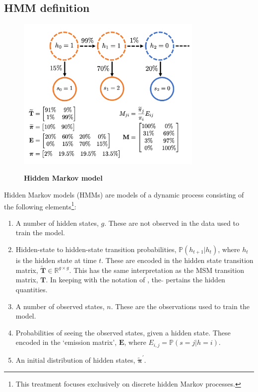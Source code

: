 \subsection{HMM definition}
\begin{figure}
    \centering
    \caption{\textbf{Hidden Markov model}}
    \includegraphics[width=0.8\textwidth]{chapters/theory/figures/hmm.png}
    \label{fig:theory_hmm}
\end{figure}
Hidden Markov models (HMMs) are models of a dynamic process consisting of the following elements\footnote{This treatment focuses exclusively on discrete hidden Markov processes.}: \cite{rabinerTutorialHiddenMarkov1989} 
\begin{enumerate}
    \item A number of hidden states, $g$. These are not observed in the data used to train the model.  
    \item Hidden-state to hidden-state transition probabilities, $\mathbb{P}(h_{t+1}|h_{t})$, where $h_{t}$ is the hidden state at time $t$. These are encoded in the hidden state transition matrix, $\widetilde{\mathbf{T}}\in \mathbb{R}^{g \times g}$. This has the same interpretation as the MSM transition matrix, $\mathbf{T}$. In keeping with the notation of \cite{noeProjectedHiddenMarkov2013a}, the $\widetilde{}$ pertains the hidden quantities. 
    \item A number of observed states, $n$. These are the observations used to train the model. 
    \item Probabilities of seeing the observed states, given a hidden state. These encoded in the `emission matrix', $\mathbf{E}$, where  $E_{i,j} = \mathbb{P}(s=j|h=i)$.  
    \item An initial distribution of hidden states, $\widetilde{\bm{\pi}}^{\prime}$.
\end{enumerate}

